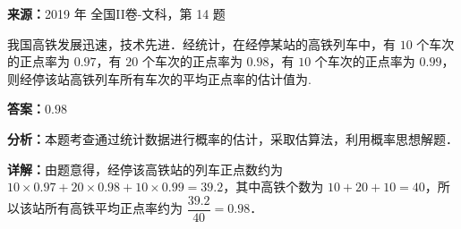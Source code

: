 \begin{question}[points=5]
\textbf{来源：}2019 年 全国II卷-文科，第 14 题\par
我国高铁发展迅速，技术先进．经统计，在经停某站的高铁列车中，有 $10$ 个车次的正点率为 $0.97$，有 $20$ 个车次的正点率为 $0.98$，有 $10$ 个车次的正点率为 $0.99$，则经停该站高铁列车所有车次的平均正点率的估计值为.
\fillin[{$0.98$}]
\begin{solution}
\textbf{答案：}$0.98$

\textbf{分析：}本题考查通过统计数据进行概率的估计，采取估算法，利用概率思想解题．

\textbf{详解：}由题意得，经停该高铁站的列车正点数约为 $10\times0.97+20\times0.98+10\times0.99=39.2$，其中高铁个数为 $10+20+10=40$，所以该站所有高铁平均正点率约为 $\dfrac{39.2}{40}=0.98$．
\end{solution}
\end{question}

